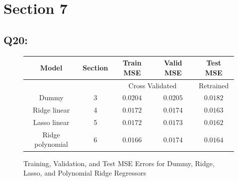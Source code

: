 \documentclass{article}
\begin{document}
\section*{Section 7}
\subsection*{Q20:}
    \begin{figure}[H]
        \centering
        \begin{tabular}{|c|c|c|c|c|}
            \hline
            \rowcolor{gray!60}
            Model & Section & Train MSE & Valid MSE & Test MSE\\ \hline
            \rowcolor{gray!20}
            ~&~ & \multicolumn{2}{c|}{Cross Validated} & Retrained \\ \hline
            Dummy & 3 & $0.0204$ & $0.0205$ & $0.0182$\\ \hline
            Ridge linear & 4 & $0.0172$ & $0.0174$ & $0.0163$\\ \hline
            Lasso linear & 5 & $0.0172$ & $0.0173$ & $0.0162$\\ \hline
            Ridge polynomial & 6 & $0.0166$ & $0.0174$ & $0.0164$\\ \hline
        \end{tabular}
        \caption{Training, Validation, and Test MSE Errors for Dummy, Ridge, Lasso, and Polynomial Ridge Regressors}
        \label{fig:q20}
    \end{figure}
\end{document}
